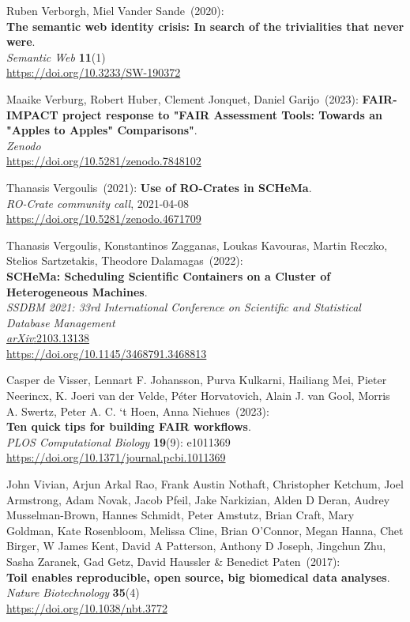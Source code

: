 \begin{thebibliography}{9}
Ruben Verborgh, Miel Vander Sande~(2020): \\
\textbf{The semantic web identity crisis: In search of the trivialities that never were}.\\
\emph{Semantic Web} \textbf{11}(1)\\
\url{https://doi.org/10.3233/SW-190372}

Maaike Verburg, Robert Huber, Clement Jonquet, Daniel Garijo~(2023):
\textbf{{FAIR-IMPACT project response to "FAIR Assessment Tools: Towards
an "Apples to Apples" Comparisons"}}.\\
\emph{Zenodo}\\
\url{https://doi.org/10.5281/zenodo.7848102}

Thanasis Vergoulis~(2021):  
\textbf{Use of RO-Crates in SCHeMa}.\\
\emph{RO-Crate community call}, 2021-04-08\\
\url{https://doi.org/10.5281/zenodo.4671709}

Thanasis Vergoulis, Konstantinos Zagganas, Loukas Kavouras, Martin Reczko, Stelios Sartzetakis, Theodore Dalamagas~(2022): \\
\textbf{SCHeMa: Scheduling Scientific Containers on a Cluster of
Heterogeneous Machines}.\\
\emph{SSDBM 2021: 33rd International Conference on Scientific and Statistical Database Management}\\
\href{https://doi.org/10.48550/arXiv.2103.13138}{\emph{arXiv}:2103.13138}\\
\url{https://doi.org/10.1145/3468791.3468813}

Casper de Visser, Lennart F. Johansson, Purva Kulkarni, Hailiang Mei, Pieter Neerincx, K. Joeri van der Velde, Péter Horvatovich, Alain J. van Gool, Morris A. Swertz, Peter A. C. ‘t Hoen, Anna Niehues~(2023):\\
\textbf{Ten quick tips for building FAIR workflows}.\\
\emph{PLOS Computational Biology} \textbf{19}(9): e1011369\\
\url{https://doi.org/10.1371/journal.pcbi.1011369}

John Vivian, Arjun Arkal Rao, Frank Austin Nothaft, Christopher
Ketchum, Joel Armstrong, Adam Novak, Jacob Pfeil, Jake Narkizian, Alden
D Deran, Audrey Musselman-Brown, Hannes Schmidt, Peter Amstutz, Brian
Craft, Mary Goldman, Kate Rosenbloom, Melissa Cline, Brian O'Connor,
Megan Hanna, Chet Birger, W James Kent, David A Patterson, Anthony D
Joseph, Jingchun Zhu, Sasha Zaranek, Gad Getz, David Haussler \&
Benedict Paten~(2017): \\
\textbf{Toil enables reproducible, open source, big biomedical data
analyses}.\\
\emph{Nature Biotechnology} \textbf{35}(4)\\
\url{https://doi.org/10.1038/nbt.3772}


\end{thebibliography}

